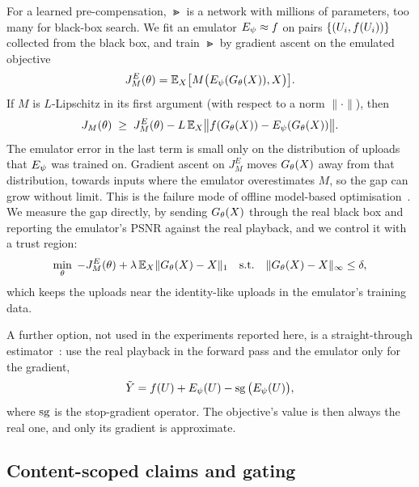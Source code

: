 For a learned pre-compensation, $\Gt$ is a network with millions of parameters, too many for
black-box search. We fit an emulator $E_{\psi}\approx f$ on pairs $\{(U_i,f(U_i))\}$ collected from the
black box, and train $\Gt$ by gradient ascent on the emulated objective
\begin{equation}
  J_M^{E}(\theta)=\mathbb{E}_{X}\big[M\big(E_{\psi}(G_{\theta}(X)),X\big)\big].
\end{equation}
If $M$ is $L$-Lipschitz in its first argument (with respect to a norm $\|\cdot\|$), then
\begin{equation}
  J_M(\theta) \;\ge\; J_M^{E}(\theta) - L\,\mathbb{E}_{X}\big\|f(G_{\theta}(X))-E_{\psi}(G_{\theta}(X))\big\|.
  \label{eq:emulator-bound}
\end{equation}
The emulator error in the last term is small only on the distribution of uploads that $E_{\psi}$ was
trained on. Gradient ascent on $J_M^E$ moves $G_{\theta}(X)$ away from that distribution, towards inputs
where the emulator overestimates $M$, so the gap can grow without limit. This is the failure mode of
offline model-based optimisation~\cite{trabucco2021conservative,yu2020mopo}. We measure the gap
directly, by sending $G_{\theta}(X)$ through the real black box and reporting the emulator's PSNR against
the real playback, and we control it with a trust region:
\begin{equation}
  \min_\theta\; -J_M^{E}(\theta) + \lambda\,\mathbb{E}_{X}\|G_{\theta}(X)-X\|_1
  \quad\text{s.t.}\quad \|G_{\theta}(X)-X\|_\infty\le\delta,
  \label{eq:trust}
\end{equation}
which keeps the uploads near the identity-like uploads in the emulator's training data.

A further option, not used in the experiments reported here, is a straight-through
estimator~\cite{bengio2013estimating,athalye2018obfuscated,pesnel2026scaled}: use the real playback
in the forward pass and the emulator only for the gradient,
\begin{equation}
  \tilde{Y} = f(U) + E_{\psi}(U) - \operatorname{sg}\big(E_{\psi}(U)\big),
\end{equation}
where $\operatorname{sg}$ is the stop-gradient operator. The objective's value is then always the real one, and
only its gradient is approximate.

\subsection{Content-scoped claims and gating}
\label{sec:content-theory}

